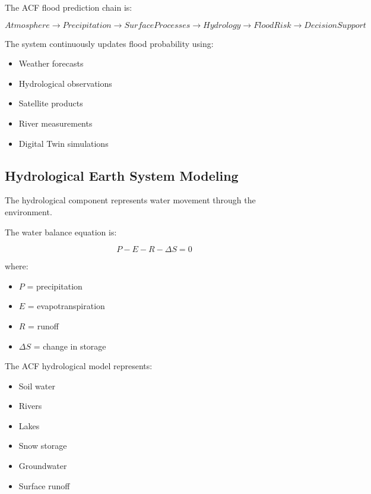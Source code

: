 The ACF flood prediction chain is:

\[
Atmosphere
\rightarrow
Precipitation
\rightarrow
Surface Processes
\rightarrow
Hydrology
\rightarrow
Flood Risk
\rightarrow
Decision Support
\]


The system continuously updates flood probability using:

\begin{itemize}

\item Weather forecasts

\item Hydrological observations

\item Satellite products

\item River measurements

\item Digital Twin simulations

\end{itemize}



\subsection{Hydrological Earth System Modeling}

The hydrological component represents water movement through the
environment.

The water balance equation is:

\[
P-E-R-\Delta S=0
\]


where:

\begin{itemize}

\item $P$ = precipitation

\item $E$ = evapotranspiration

\item $R$ = runoff

\item $\Delta S$ = change in storage

\end{itemize}


The ACF hydrological model represents:

\begin{itemize}

\item Soil water

\item Rivers

\item Lakes

\item Snow storage

\item Groundwater

\item Surface runoff

\end{itemize}


